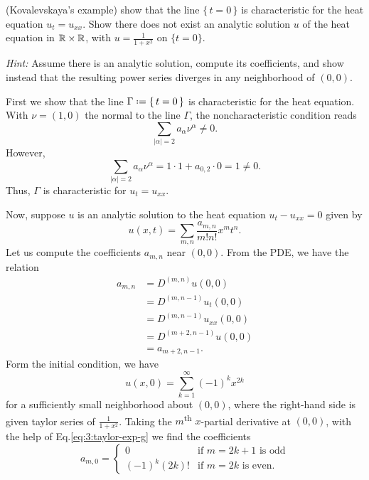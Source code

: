 \begin{problem}
  (Kovalevskaya's example) show that the line \(\{\,t=0\,\}\) is
  characteristic for the heat equation \(u_t=u_{xx}\). Show there does not
  exist an analytic solution \(u\) of the heat equation in \(\mathbb{R}\times\mathbb{R}\),
  with \(u=\frac{1}{1+x^2}\) on \(\{t=0\}\).

  \noindent\emph{Hint:} Assume there is an analytic solution, compute its
  coefficients, and show instead that the resulting power series diverges
  in any neighborhood of \((0,0)\).
\end{problem}
\begin{solution*}
  First we show that the line \(\Gamma\defeq\{\,t=0\,\}\) is characteristic
  for the heat equation. With \(\nu=(1,0)\) the normal to the line
  \(\Gamma\), the noncharacteristic condition reads
  \[
    \sum_{|\alpha|=2} a_\alpha\nu^\alpha\neq 0.
  \]
  However,
  \[
    \sum_{|\alpha|=2} a_\alpha\nu^\alpha=%
    1\cdot 1+a_{0,2}\cdot 0=%
    1\neq%
    0.
  \]
  Thus, \(\Gamma\) is characteristic for \(u_t=u_{xx}\).

  Now, suppose \(u\) is an analytic solution to the heat equation
  \(u_t-u_{xx}=0\) given by
  \[
    u(x,t)=\sum_{m,n} \frac{a_{m,n}}{m!n!}x^mt^n.
  \]
  Let us compute the coefficients \(a_{m,n}\) near \((0,0)\). From the PDE,
  we have the relation
  \begin{equation}
    \label{eq:3:pde-relation}
    \begin{aligned}
      a_{m,n}
      &=D^{(m,n)} u(0,0)\\
      &=D^{(m,n-1)}u_t(0,0)\\
      &=D^{(m,n-1)}u_{xx}(0,0)\\
      &=D^{(m+2,n-1)}u(0,0)\\
      &=a_{m+2,n-1}.
    \end{aligned}
  \end{equation}
  Form the initial condition, we have
  \begin{equation}
    \label{eq:3:taylor-exp-g}
    u(x,0)=\sum_{k=1}^\infty (-1)^k x^{2k}
  \end{equation}
  for a sufficiently small neighborhood about \((0,0)\), where the
  right-hand side is given taylor series of \(\frac{1}{1+x^2}\). Taking the
  \(m\)\textsuperscript{th} \(x\)-partial derivative at \((0,0)\), with the
  help of Eq.\@ \eqref{eq:3:taylor-exp-g} we find the coefficients
  \begin{equation}
    \label{eq:3:boundary-relation}
    a_{m,0}=
    \begin{cases}
      0&\text{if \(m=2k+1\) is odd}\\
      (-1)^k(2k)!&\text{if \(m=2k\) is even.}
    \end{cases}
  \end{equation}


\end{solution*}

